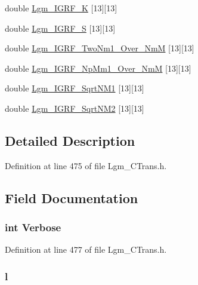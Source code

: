 \begin{CompactItemize}
double \hyperlink{struct_lgm___c_trans_50a4c2c4f015a684f40fe14a3d4dcc80}{Lgm\_\-IGRF\_\-K} \mbox{[}13\mbox{]}\mbox{[}13\mbox{]}
\item 
double \hyperlink{struct_lgm___c_trans_6c8cb5804769345f93dc684349e5232f}{Lgm\_\-IGRF\_\-S} \mbox{[}13\mbox{]}\mbox{[}13\mbox{]}
\item 
double \hyperlink{struct_lgm___c_trans_c6a0474a9ba424b11192a468df4b71bf}{Lgm\_\-IGRF\_\-TwoNm1\_\-Over\_\-NmM} \mbox{[}13\mbox{]}\mbox{[}13\mbox{]}
\item 
double \hyperlink{struct_lgm___c_trans_96a1803f9964fff5d9095953e098437f}{Lgm\_\-IGRF\_\-NpMm1\_\-Over\_\-NmM} \mbox{[}13\mbox{]}\mbox{[}13\mbox{]}
\item 
double \hyperlink{struct_lgm___c_trans_447bb9f7fa254244901964f96c0ccf2f}{Lgm\_\-IGRF\_\-SqrtNM1} \mbox{[}13\mbox{]}\mbox{[}13\mbox{]}
\item 
double \hyperlink{struct_lgm___c_trans_fbdaf18ce038d57df3465a30a2a72b11}{Lgm\_\-IGRF\_\-SqrtNM2} \mbox{[}13\mbox{]}\mbox{[}13\mbox{]}
\end{CompactItemize}


\subsection{Detailed Description}


Definition at line 475 of file Lgm\_\-CTrans.h.

\subsection{Field Documentation}
\hypertarget{struct_lgm___c_trans_95f627d7054b1abbffa2c6ea19bf05db}{
\subsubsection[{Verbose}]{\setlength{\rightskip}{0pt plus 5cm}int {\bf Verbose}}}
\label{struct_lgm___c_trans_95f627d7054b1abbffa2c6ea19bf05db}




Definition at line 477 of file Lgm\_\-CTrans.h.\hypertarget{struct_lgm___c_trans_0228728c0f932a0af4566cdf20868cd4}{
\subsubsection[{l}]{ {\bf l}}}
\label{struct_lgm___c_trans_0228728c0f932a0af4566cdf20868cd4}


